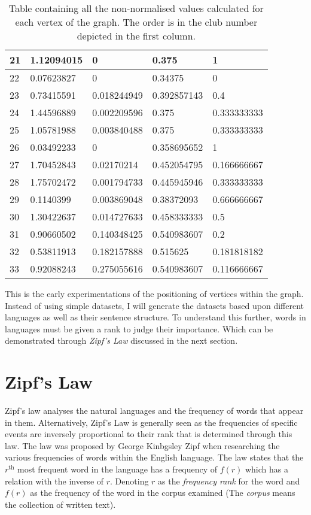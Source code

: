 \begin{table}[!htb]
\begin{tabular}{|l|l|l|l|l|}
        21 & 1.12094015 & 0 & 0.375 & 1 \\ \hline
        22 & 0.07623827 & 0 & 0.34375 & 0 \\ \hline
        23 & 0.73415591 & 0.018244949 & 0.392857143 & 0.4 \\ \hline
        24 & 1.44596889 & 0.002209596 & 0.375 & 0.333333333 \\ \hline
        25 & 1.05781988 & 0.003840488 & 0.375 & 0.333333333 \\ \hline
        26 & 0.03492233 & 0 & 0.358695652 & 1 \\ \hline
        27 & 1.70452843 & 0.02170214 & 0.452054795 & 0.166666667 \\ \hline
        28 & 1.75702472 & 0.001794733 & 0.445945946 & 0.333333333 \\ \hline
        29 & 0.1140399 & 0.003869048 & 0.38372093 & 0.666666667 \\ \hline
        30 & 1.30422637 & 0.014727633 & 0.458333333 & 0.5 \\ \hline
        31 & 0.90660502 & 0.140348425 & 0.540983607 & 0.2 \\ \hline
        32 & 0.53811913 & 0.182157888 & 0.515625 & 0.181818182 \\ \hline
        33 & 0.92088243 & 0.275055616 & 0.540983607 & 0.116666667 \\ \hline
    \end{tabular}
	\caption{Table containing all the non-normalised values calculated for each vertex of the graph. The order is in the club number depicted in the first column.}
    \label{KarateTable}
\end{table}

This is the early experimentations of the positioning of vertices within the graph. Instead of using simple datasets, I will generate the datasets based upon different languages as well as their sentence structure. To understand this further, words in languages must be given a rank to judge their importance. Which can be demonstrated through \emph{Zipf's Law} discussed in the next section.

\section{Zipf's Law}
Zipf's law analyses the natural languages and the frequency of words that appear in them. Alternatively, Zipf's Law \cite{hosch2009zipf} is generally seen as the frequencies of specific events are inversely proportional to their rank that is determined through this law. The law was proposed by George Kinbgsley Zipf when researching the various frequencies of words within the English language. The law states that the $r^{\text{th}}$ most frequent word in the language has a frequency of $f(r)$ which has a relation with the inverse of $r$. Denoting $r$ as the \emph{frequency rank} for the word and $f(r)$ as the frequency of the word in the corpus examined (The \emph{corpus} means the collection of written text).

